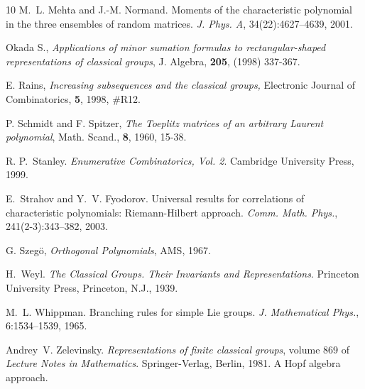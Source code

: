 \documentclass[11pt]{amsart}
\begin{document}
\begin{thebibliography}{10}
M.~L. Mehta and J.-M. Normand. {\newblock}Moments of the
characteristic polynomial in the three ensembles of random
matrices. {\newblock} \textit{J. Phys. A}, 34(22):4627--4639,
2001.

Okada S., \emph{Applications of minor sumation formulas to
rectangular-shaped representations of classical groups}, J.
Algebra, \textbf{205}, (1998) 337-367.

E. Rains, {\em Increasing subsequences and the classical groups,}
Electronic Journal of Combinatorics, \textbf{5}, 1998, $\#$R12.


P. Schmidt and F. Spitzer, \emph{The Toeplitz matrices of an
arbitrary Laurent polynomial}, Math. Scand., \textbf{8}, 1960,
15-38.

R. P.~Stanley. {\em Enumerative Combinatorics, Vol. 2}. Cambridge
University Press, 1999.

E.~Strahov and Y.~V. Fyodorov. {\newblock}Universal results
for correlations of characteristic polynomials: Riemann-Hilbert
approach. {\newblock} \textit{Comm. Math. Phys.},
241(2-3):343--382, 2003.

G. Szeg\"{o}, \emph{Orthogonal Polynomials}, AMS, 1967.

H.~Weyl. {\newblock} \textit{The Classical Groups. Their
Invariants and Representations}. {\newblock}Princeton University
Press, Princeton, N.J., 1939.

M.~L. Whippman. {\newblock}Branching rules for simple
Lie groups. {\newblock} \textit{J. Mathematical Phys.},
6:1534--1539, 1965.

Andrey~V. Zelevinsky. {\newblock}
\textit{Representations of finite classical groups}, volume 869 of
\textit{Lecture Notes in Mathematics}. {\newblock}Springer-Verlag,
Berlin, 1981. {\newblock}A Hopf algebra approach.
\end{thebibliography}
\end{document}
